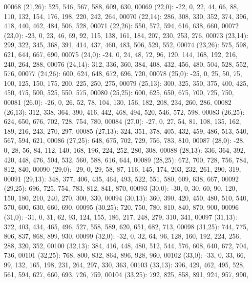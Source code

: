 \begin{DoxyCode}
00068       (21,26): 525, 546, 567, 588, 609, 630,
00069       (22,0): -22, 0, 22, 44, 66, 88, 110, 132, 154, 176, 198, 220, 242, 264,
00070       (22,14): 286, 308, 330, 352, 374, 396, 418, 440, 462, 484, 506, 528,
00071       (22,26): 550, 572, 594, 616, 638, 660,
00072       (23,0): -23, 0, 23, 46, 69, 92, 115, 138, 161, 184, 207, 230, 253, 276,
00073       (23,14): 299, 322, 345, 368, 391, 414, 437, 460, 483, 506, 529, 552,
00074       (23,26): 575, 598, 621, 644, 667, 690,
00075       (24,0): -24, 0, 24, 48, 72, 96, 120, 144, 168, 192, 216, 240, 264, 288,
00076       (24,14): 312, 336, 360, 384, 408, 432, 456, 480, 504, 528, 552, 576,
00077       (24,26): 600, 624, 648, 672, 696, 720,
00078       (25,0): -25, 0, 25, 50, 75, 100, 125, 150, 175, 200, 225, 250, 275,
00079       (25,13): 300, 325, 350, 375, 400, 425, 450, 475, 500, 525, 550, 575,
00080       (25,25): 600, 625, 650, 675, 700, 725, 750,
00081       (26,0): -26, 0, 26, 52, 78, 104, 130, 156, 182, 208, 234, 260, 286,
00082       (26,13): 312, 338, 364, 390, 416, 442, 468, 494, 520, 546, 572, 598,
00083       (26,25): 624, 650, 676, 702, 728, 754, 780,
00084       (27,0): -27, 0, 27, 54, 81, 108, 135, 162, 189, 216, 243, 270, 297,
00085       (27,13): 324, 351, 378, 405, 432, 459, 486, 513, 540, 567, 594, 621,
00086       (27,25): 648, 675, 702, 729, 756, 783, 810,
00087       (28,0): -28, 0, 28, 56, 84, 112, 140, 168, 196, 224, 252, 280, 308,
00088       (28,13): 336, 364, 392, 420, 448, 476, 504, 532, 560, 588, 616, 644,
00089       (28,25): 672, 700, 728, 756, 784, 812, 840,
00090       (29,0): -29, 0, 29, 58, 87, 116, 145, 174, 203, 232, 261, 290, 319,
00091       (29,13): 348, 377, 406, 435, 464, 493, 522, 551, 580, 609, 638, 667,
00092       (29,25): 696, 725, 754, 783, 812, 841, 870,
00093       (30,0): -30, 0, 30, 60, 90, 120, 150, 180, 210, 240, 270, 300, 330,
00094       (30,13): 360, 390, 420, 450, 480, 510, 540, 570, 600, 630, 660, 690,
00095       (30,25): 720, 750, 780, 810, 840, 870, 900,
00096       (31,0): -31, 0, 31, 62, 93, 124, 155, 186, 217, 248, 279, 310, 341,
00097       (31,13): 372, 403, 434, 465, 496, 527, 558, 589, 620, 651, 682, 713,
00098       (31,25): 744, 775, 806, 837, 868, 899, 930,
00099       (32,0): -32, 0, 32, 64, 96, 128, 160, 192, 224, 256, 288, 320, 352,
00100       (32,13): 384, 416, 448, 480, 512, 544, 576, 608, 640, 672, 704, 736,
00101       (32,25): 768, 800, 832, 864, 896, 928, 960,
00102       (33,0): -33, 0, 33, 66, 99, 132, 165, 198, 231, 264, 297, 330, 363,
00103       (33,13): 396, 429, 462, 495, 528, 561, 594, 627, 660, 693, 726, 759,
00104       (33,25): 792, 825, 858, 891, 924, 957, 990,

\end{DoxyCode}
